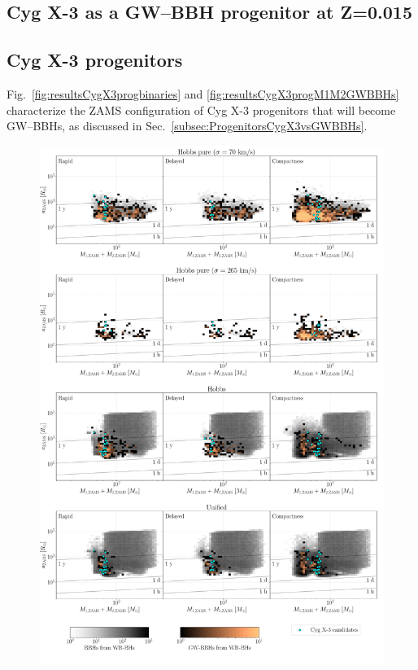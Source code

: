 \documentclass[a4paper,titlepage]{book}     	%
\begin{document}
\begin{appendices}
\section{Cyg X-3 as a GW--BBH progenitor at Z=0.015}\label{appsec:CYgX3GWBBHs}
\subsection{Cyg X-3 progenitors}\label{appsubsec:ProgenitorsCygX3vsGWBBHs}
Fig.\ \ref{fig:resultsCygX3progbinaries} and \ref{fig:resultsCygX3progM1M2GWBBHs} characterize the ZAMS configuration of Cyg X-3 progenitors that will become GW--BBHs, as discussed in Sec.\ \ref{subsec:ProgenitorsCygX3vsGWBBHs}.



\begin{figure}
	\centering
	\includegraphics[width=\textwidth]{./images/kickcompare_prog_015.pdf}	

\end{figure}
\end{appendices}
\end{document}
